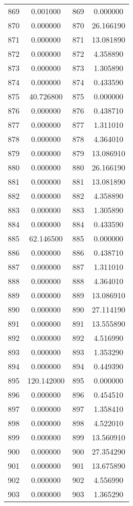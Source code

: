 \documentclass[12pt]{article}
\begin{document}
\begin{longtable}{@{}cccc@{}}
869 & 0.001000 & 869 & 0.000000 \\
870 & 0.000000 & 870 & 26.166190 \\
871 & 0.000000 & 871 & 13.081890 \\
872 & 0.000000 & 872 & 4.358890 \\
873 & 0.000000 & 873 & 1.305890 \\
874 & 0.000000 & 874 & 0.433590 \\
875 & 40.726800 & 875 & 0.000000 \\
876 & 0.000000 & 876 & 0.438710 \\
877 & 0.000000 & 877 & 1.311010 \\
878 & 0.000000 & 878 & 4.364010 \\
879 & 0.000000 & 879 & 13.086910 \\
880 & 0.000000 & 880 & 26.166190 \\
881 & 0.000000 & 881 & 13.081890 \\
882 & 0.000000 & 882 & 4.358890 \\
883 & 0.000000 & 883 & 1.305890 \\
884 & 0.000000 & 884 & 0.433590 \\
885 & 62.146500 & 885 & 0.000000 \\
886 & 0.000000 & 886 & 0.438710 \\
887 & 0.000000 & 887 & 1.311010 \\
888 & 0.000000 & 888 & 4.364010 \\
889 & 0.000000 & 889 & 13.086910 \\
890 & 0.000000 & 890 & 27.114190 \\
891 & 0.000000 & 891 & 13.555890 \\
892 & 0.000000 & 892 & 4.516990 \\
893 & 0.000000 & 893 & 1.353290 \\
894 & 0.000000 & 894 & 0.449390 \\
895 & 120.142000 & 895 & 0.000000 \\
896 & 0.000000 & 896 & 0.454510 \\
897 & 0.000000 & 897 & 1.358410 \\
898 & 0.000000 & 898 & 4.522010 \\
899 & 0.000000 & 899 & 13.560910 \\
900 & 0.000000 & 900 & 27.354290 \\
901 & 0.000000 & 901 & 13.675890 \\
902 & 0.000000 & 902 & 4.556990 \\
903 & 0.000000 & 903 & 1.365290 \\

\end{longtable}
\end{document}
